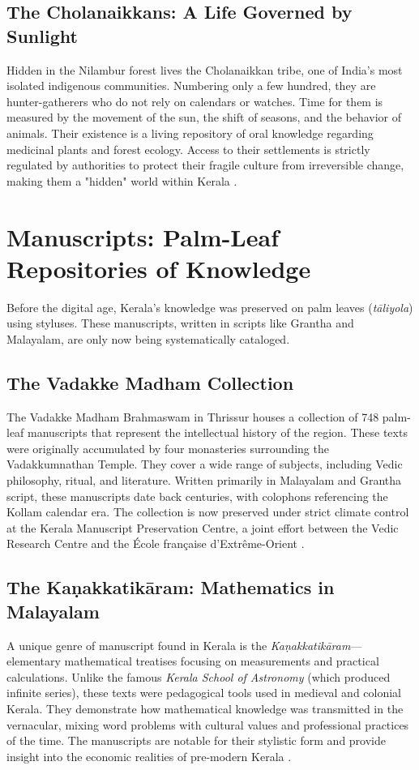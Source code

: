 \documentclass[12pt]{article}
\begin{document}
\subsection{The Cholanaikkans: A Life Governed by Sunlight}
Hidden in the Nilambur forest lives the Cholanaikkan tribe, one of India's most isolated indigenous communities. Numbering only a few hundred, they are hunter-gatherers who do not rely on calendars or watches. Time for them is measured by the movement of the sun, the shift of seasons, and the behavior of animals. Their existence is a living repository of oral knowledge regarding medicinal plants and forest ecology. Access to their settlements is strictly regulated by authorities to protect their fragile culture from irreversible change, making them a "hidden" world within Kerala \cite{cholanaikkans}.

\section{Manuscripts: Palm-Leaf Repositories of Knowledge}
Before the digital age, Kerala's knowledge was preserved on palm leaves (\textit{tāliyola}) using styluses. These manuscripts, written in scripts like Grantha and Malayalam, are only now being systematically cataloged.

\subsection{The Vadakke Madham Collection}
The Vadakke Madham Brahmaswam in Thrissur houses a collection of 748 palm-leaf manuscripts that represent the intellectual history of the region. These texts were originally accumulated by four monasteries surrounding the Vadakkumnathan Temple. They cover a wide range of subjects, including Vedic philosophy, ritual, and literature. Written primarily in Malayalam and Grantha script, these manuscripts date back centuries, with colophons referencing the Kollam calendar era. The collection is now preserved under strict climate control at the Kerala Manuscript Preservation Centre, a joint effort between the Vedic Research Centre and the École française d’Extrême-Orient \cite{palmleaf}.

\subsection{The Kaṇakkatikāram: Mathematics in Malayalam}
A unique genre of manuscript found in Kerala is the \textit{Kaṇakkatikāram}—elementary mathematical treatises focusing on measurements and practical calculations. Unlike the famous \textit{Kerala School of Astronomy} (which produced infinite series), these texts were pedagogical tools used in medieval and colonial Kerala. They demonstrate how mathematical knowledge was transmitted in the vernacular, mixing word problems with cultural values and professional practices of the time. The manuscripts are notable for their stylistic form and provide insight into the economic realities of pre-modern Kerala \cite{math}.
\end{document}
